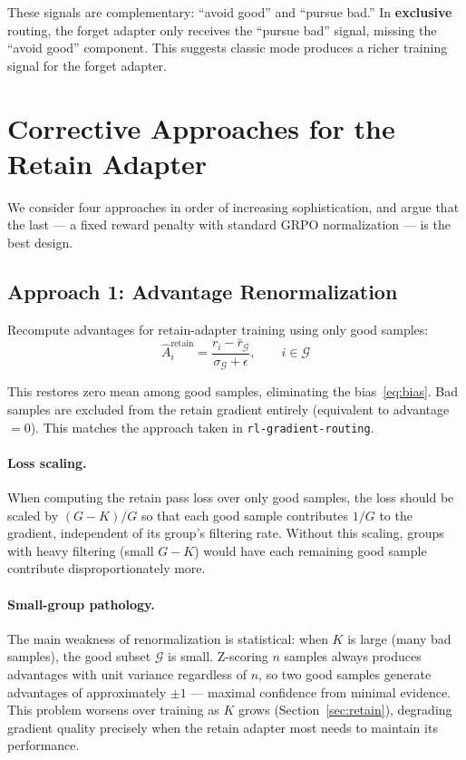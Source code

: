 \documentclass[11pt]{article}
\begin{document}
These signals are complementary: ``avoid good'' and ``pursue bad.''
In \textbf{exclusive} routing, the forget adapter only receives the
``pursue bad'' signal, missing the ``avoid good'' component. This suggests
classic mode produces a richer training signal for the forget adapter.

\section{Corrective Approaches for the Retain Adapter}\label{sec:corrections}

We consider four approaches in order of increasing sophistication, and argue
that the last --- a fixed reward penalty with standard GRPO normalization ---
is the best design.

\subsection{Approach 1: Advantage Renormalization}\label{sec:renorm}

Recompute advantages for retain-adapter training using only good samples:
\begin{equation}\label{eq:renorm}
    \hat{A}_i^{\text{retain}}
    = \frac{r_i - \bar{r}_{\mathcal{G}}}{\sigma_{\mathcal{G}} + \epsilon},
    \qquad i \in \mathcal{G}
\end{equation}

This restores zero mean among good samples, eliminating the
bias~\eqref{eq:bias}. Bad samples are excluded from the retain gradient
entirely (equivalent to advantage $= 0$). This matches the approach taken in
\texttt{rl-gradient-routing}.

\paragraph{Loss scaling.}
When computing the retain pass loss over only good samples, the loss should be
scaled by $(G - K) / G$ so that each good sample contributes $1/G$ to the
gradient, independent of its group's filtering rate. Without this scaling,
groups with heavy filtering (small $G - K$) would have each remaining good
sample contribute disproportionately more.

\paragraph{Small-group pathology.}
The main weakness of renormalization is statistical: when $K$ is large (many bad
samples), the good subset $\mathcal{G}$ is small. Z-scoring $n$ samples always
produces advantages with unit variance regardless of $n$, so two good samples
generate advantages of approximately $\pm 1$ --- maximal confidence from minimal
evidence. This problem worsens over training as $K$ grows
(Section~\ref{sec:retain}), degrading gradient quality precisely when the retain
adapter most needs to maintain its performance.
\end{document}
